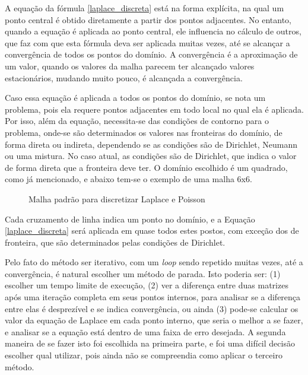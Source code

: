 \documentclass[journal]{IEEEtran}
\begin{document}
A equação da fórmula \ref{laplace_discreta} está na forma explícita, na qual um ponto central é obtido diretamente a partir dos pontos adjacentes. No entanto, quando a equação é aplicada ao ponto central, ele influencia no cálculo de outros, que faz com que esta fórmula deva ser aplicada muitas vezes, até se alcançar a convergência de todos os pontos do domínio. A convergência é a aproximação de um valor, quando os valores da malha parecem ter alcançado valores estacionários, mudando muito pouco, é alcançada a convergência.

Caso essa equação é aplicada a todos os pontos do domínio, se nota um problema, pois ela requere pontos adjacentes em todo local no qual ela é aplicada. Por isso, além da equação, necessita-se das condições de contorno para o problema, onde-se são determinados os valores nas fronteiras do domínio, de forma direta ou indireta, dependendo se as condições são de Dirichlet, Neumann ou uma mistura. No caso atual, as condições são de Dirichlet, que indica o valor de forma direta que a fronteira deve ter. O domínio escolhido é um quadrado, como já mencionado, e abaixo tem-se o exemplo de uma malha 6x6.

\begin{figure}[!ht]
\centering
{}
\caption{Malha padrão para discretizar Laplace e Poisson\label{malha_poisson}}
\end{figure}
Cada cruzamento de linha indica um ponto no domínio, e a Equação \ref{laplace_discreta} será aplicada em quase todos estes postos, com exceção dos de fronteira, que são determinados pelas condições de Dirichlet. 

Pelo fato do método ser iterativo, com um \textit{loop} sendo repetido muitas vezes, até a convergência, é natural escolher um método de parada. Isto poderia ser: (1) escolher um tempo limite de execução, (2) ver a diferença entre duas matrizes após uma iteração completa em seus pontos internos, para analisar se a diferença entre elas é desprezível e se indica convergência, ou ainda (3) pode-se calcular os valor da equação de Laplace em cada ponto interno, que seria o melhor a se fazer, e analisar se a equação está dentro de uma faixa de erro desejada. A segunda maneira de se fazer isto foi escolhida na primeira parte, e foi uma difícil decisão escolher qual utilizar, pois ainda não se compreendia como aplicar o terceiro método.
\end{document}
